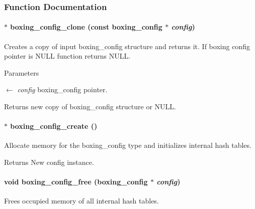 \subsubsection{Function Documentation}
\hypertarget{group__config_gab662dff6c036f3672b7711191a853868}{
\paragraph[{boxing\_\-config\_\-clone}]{$\ast$ boxing\_\-config\_\-clone (const {\bf boxing\_\-config} $\ast$ {\em config})}\hfill}
\label{group__config_gab662dff6c036f3672b7711191a853868}
Creates a copy of input boxing\_\-config structure and returns it. If boxing config pointer is NULL function returns NULL.


\begin{DoxyParams}{Parameters}
\item[\mbox{$\leftarrow$} {\em config}]boxing\_\-config pointer. \end{DoxyParams}
\begin{DoxyReturn}{Returns}
new copy of boxing\_\-config structure or NULL. 
\end{DoxyReturn}
\hypertarget{group__config_ga244626b48bf3730a4a18eaac07be13fd}{
\paragraph[{boxing\_\-config\_\-create}]{$\ast$ boxing\_\-config\_\-create ()}\hfill}
\label{group__config_ga244626b48bf3730a4a18eaac07be13fd}
Allocate memory for the boxing\_\-config type and initializes internal hash tables.

\begin{DoxyReturn}{Returns}
New config instance. 
\end{DoxyReturn}
\hypertarget{group__config_ga344b21cc581e954c02318d24cc11fb7d}{
\paragraph[{boxing\_\-config\_\-free}]{\setlength{\rightskip}{0pt plus 5cm}void boxing\_\-config\_\-free ({\bf boxing\_\-config} $\ast$ {\em config})}\hfill}
\label{group__config_ga344b21cc581e954c02318d24cc11fb7d}
Frees occupied memory of all internal hash tables.


